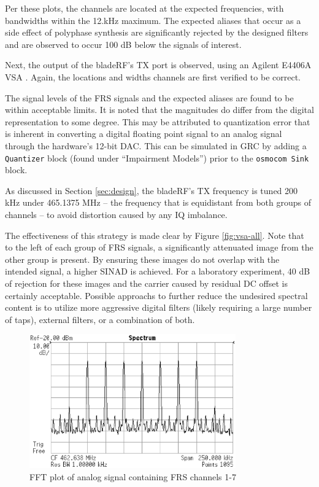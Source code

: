 Per these plots, the channels are located at the expected frequencies, with
bandwidths within the 12.kHz maximum. The expected aliases that occur as a side
effect of polyphase synthesis \cite{TRONDEAU_PFB} are significantly rejected by
the designed filters and are observed to occur 100 dB below the signals of
interest.

Next, the output of the bladeRF's \ac{TX} port is observed, using an
Agilent E4406A \ac{VSA} \cite{VSA}. Again, the locations and widths channels
are first verified to be correct.

The signal levels of the \ac{FRS} signals and the expected aliases are found to
be within acceptable limits. It is noted that the magnitudes do differ from the
digital representation to some degree. This may be attributed to quantization
error that is inherent in converting a digital floating point signal to an
analog signal through the hardware's 12-bit \ac{DAC}. This can be simulated in
\ac{GRC} by adding a \texttt{Quantizer} block (found under ``Impairment
Models'') prior to the \texttt{osmocom Sink} block.

As discussed in Section \ref{sec:design}, the bladeRF's \ac{TX} frequency
is tuned 200 kHz under 465.1375 MHz -- the frequency that is equidistant from both
groups of channels -- to avoid distortion caused by any IQ imbalance.

The effectiveness of this strategy is made clear by Figure \ref{fig:vsa-all}.
Note that to the left of each group of \ac{FRS} signals, a significantly
attenuated image from the other group is present. By ensuring these images
do not overlap with the intended signal, a higher \ac{SINAD} is achieved.
For a laboratory experiment, 40 dB of rejection for these images and the 
carrier caused by residual DC offset is certainly acceptable. Possible
approachs to further reduce the undesired spectral content is to utilize
more aggressive digital filters (likely requiring a large number of taps),
external filters, or a combination of both.

\begin{figure}[h]
  \centering
  \includegraphics[width=3.5in]{images/frs/results/ch1-7.eps}
  \caption{FFT plot of analog signal containing FRS channels 1-7}
  \label{fig:vsa-ch1-7}
\end{figure}

